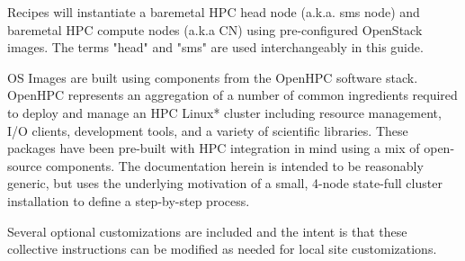 
Recipes will instantiate a baremetal HPC head node (a.k.a. sms node) and baremetal HPC compute nodes (a.k.a CN) using pre-configured OpenStack images. The terms "head" and "sms" are used interchangeably in this guide.

OS Images are built using components from the OpenHPC software stack. OpenHPC represents an aggregation of a number of common ingredients required to deploy and manage an HPC Linux* cluster including resource management, I/O clients, development tools, and a variety of scientific libraries. These packages have been pre-built with HPC integration in mind using a mix of open-source components. The documentation herein is intended to be reasonably generic,
but uses the underlying motivation of a small, 4-node state-full cluster installation to define a step-by-step process. 

Several optional customizations are included and the intent is that these collective instructions can be modified as needed for local site customizations.

